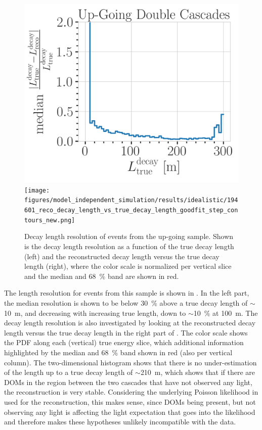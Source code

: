 \begin{figure}[h]
	\centering
    \includegraphics[width=0.49\linewidth]{figures/model_independent_simulation/results/idealistic/194601_median_decay_length_resolution_goodfit_log_unweighted.png}
    \texttt{[image: figures/model\_independent\_simulation/results/idealistic/194601\_reco\_decay\_length\_vs\_true\_decay\_length\_goodfit\_step\_contours\_new.png]}
    \caption[Up-going double-cascade decay length resolution]{Decay length resolution of events from the up-going sample. Shown is the decay length resolution as a function of the true decay length (left) and the reconstructed decay length versus the true decay length (right), where the color scale is normalized per vertical slice and the median and \SI{68}{\percent} band are shown in red.}
\end{figure}

The length resolution for events from this sample is shown in . In the left part, the median resolution is shown to be below \SI{30}{\percent} above a true decay length of $\sim$\SI{10}{\meter}, and decreasing with increasing true length, down to $\sim$\SI{10}{\percent} at \SI{100}{\meter}. The decay length resolution is also investigated by looking at the reconstructed decay length versus the true decay length in the right part of . The color scale shows the PDF along each (vertical) true energy slice, which additional information highlighted by the median and \SI{68}{\percent} band shown in red (also per vertical column). The two-dimensional histogram shows that there is no under-estimation of the length up to a true decay length of $\sim$\SI{210}{\meter}, which shows that if there are DOMs in the region between the two cascades that have not observed any light, the reconstruction is very stable. Considering the underlying Poisson likelihood in  used for the reconstruction, this makes sense, since DOMs being present, but not observing any light is affecting the light expectation that goes into the likelihood and therefore makes these hypotheses unlikely incompatible with the data.


